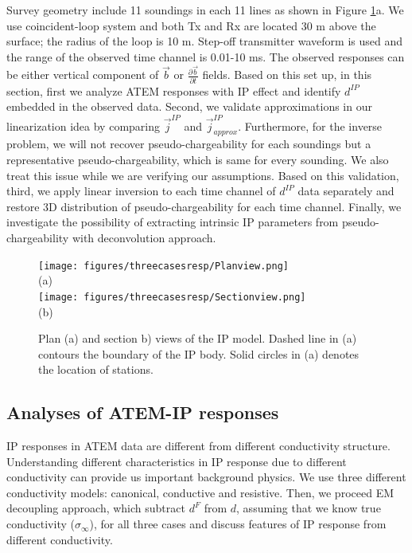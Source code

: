 \documentclass[a4paper, 11pt]{article}
\newcommand{\siginf}{\sigma_\infty}
\renewcommand {\j}  { {\vec j} }
\renewcommand {\b}  { {\vec b} }
\newcommand{\dip}{d^{IP}}
\begin{document}
Survey geometry include 11 soundings in each 11 lines as shown in Figure \ref{F: IPModel}a. We use coincident-loop system and both Tx and Rx are located 30 m above the surface; the radius of the loop is 10 m. Step-off transmitter waveform is used and the range of the observed time channel is 0.01-10 ms. The observed responses can be either vertical component of $\b$ or $\frac{\partial \b}{\partial t}$ fields. Based on this set up, in this section, first we analyze ATEM responses with IP effect and identify $\dip$ embedded in the observed data. Second, we validate approximations in our linearization idea by comparing $\j^{IP}$ and $\j^{IP}_{approx}$. Furthermore, for the inverse problem, we will not recover pseudo-chargeability for each soundings but a representative pseudo-chargeability, which is same for every sounding. We also treat this issue while we are verifying our assumptions. 
Based on this validation, third, we apply linear inversion to each time channel of $\dip$ data separately and restore 3D distribution of pseudo-chargeability for each time channel. Finally, we investigate the possibility of extracting intrinsic IP parameters from pseudo-chargeability with deconvolution approach. 

\begin{figure}[htb]
  \centering
  \texttt{[image: figures/threecasesresp/Planview.png]} \\
  (a) \\
  \texttt{[image: figures/threecasesresp/Sectionview.png]} \\
  (b)
  \caption{Plan (a) and section b) views of the IP model. Dashed line in (a) contours the boundary of the IP body. Solid circles in (a) denotes the location of stations.}
  \label{F: IPModel}
\end{figure}
\clearpage
\subsection{Analyses of ATEM-IP responses}
IP responses in ATEM data are different from different conductivity structure. Understanding different characteristics in IP response due to different conductivity can provide us important background physics. We use three different conductivity models: canonical, conductive and resistive. Then,  we proceed EM decoupling approach, which subtract $d^F$ from $d$,  assuming that we know true conductivity ($\siginf$), for all three cases and discuss features of IP response from different conductivity. 
\end{document}
